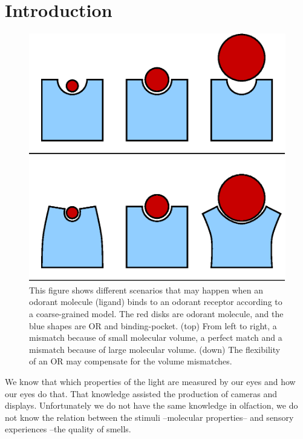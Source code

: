 \documentclass[11pt]{paper} %
\begin{document}
\section*{Introduction}
\begin{figure}
	\centering
	\includegraphics[width=0.4 \textwidth]{binding-pocket-size-flex}
	\caption{This figure shows different scenarios that may happen when an odorant molecule (ligand) binds to an odorant receptor according to a coarse-grained model. 
		The red disks  are odorant molecule, 
		and the blue shapes are OR and binding-pocket.	
		(top) From left to right, a mismatch because of small molecular volume, 
		a perfect match and a mismatch because of large molecular volume.
		(down) The flexibility of an OR may compensate for the volume mismatches.
		}
	\label{fig:binding-pocket}
\end{figure}


We know that which properties of the light are measured by our eyes and how our eyes do that. 
That knowledge assisted the production of cameras and displays. 
Unfortunately we do not have the same knowledge in olfaction, 
we do not know the relation between the stimuli --molecular properties-- and sensory experiences --the quality of smells.  

\end{document}
